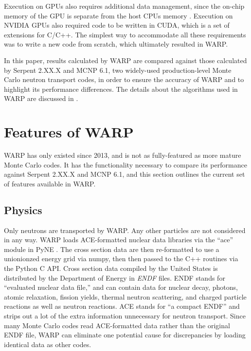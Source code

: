 \documentclass[preprint,12pt]{elsarticle}
\begin{document}
Execution on GPUs also requires additional data management, since the on-chip memory of the GPU is separate from the host CPUs memory \cite{cuda}.  Execution on NVIDIA GPUs also required code to be written in CUDA, which is a set of extensions for C/C++.  The simplest way to accommodate all these requirements was to write a new code from scratch, which ultimately resulted in WARP.  

In this paper, results calculated by WARP are compared against those calculated by Serpent 2.XX.X and MCNP 6.1, two widely-used production-level Monte Carlo neutron transport codes, in order to ensure the accuracy of WARP and to highlight its performance differences.  The details about the algorithms used in WARP are discussed in \cite{algorithms}.


\section{Features of WARP}
\label{sec:features}

WARP has only existed since 2013, and is not as fully-featured as more mature Monte Carlo codes.  It has the functionality necessary to compare its performance against  Serpent 2.XX.X and MCNP 6.1, and this section outlines the current set of features available in WARP.  

\subsection{Physics}

Only neutrons are transported by WARP.  Any other particles are not considered in any way.  WARP loads ACE-formatted nuclear data libraries via the ``ace'' module in PyNE \cite{}.  The cross section data are then re-formatted to use a unionionzed energy grid via numpy, then then passed to the C++ routines via the Python C API.  Cross section data compiled by the United States is distributed by the Department of Energy in \emph{ENDF} files.  ENDF stands for ``evaluated nuclear data file,'' and can contain data for nuclear decay, photons, atomic relaxation, fission yields, thermal neutron scattering, and charged particle reactions as well as neutron reactions.  ACE stands for ``a compact ENDF'' and strips out a lot of the extra information unnecessary for neutron transport.  Since many Monte Carlo codes read ACE-formatted data rather than the original ENDF file, WARP can eliminate one potential cause for discrepancies by loading identical data as other codes.  
\end{document}
